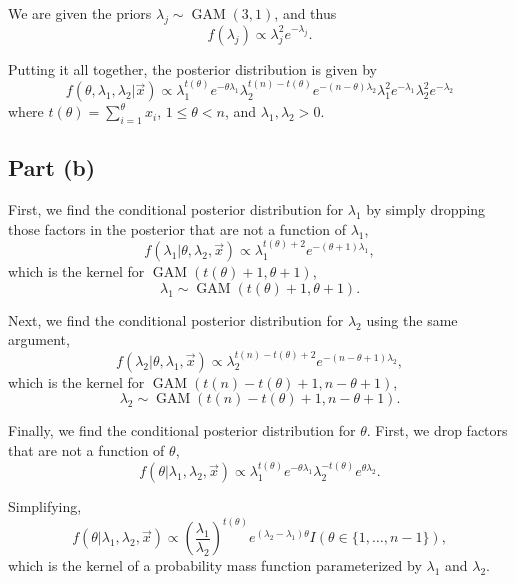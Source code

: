 \documentclass[
  11pt,
]{article}
\begin{document}
We are given the priors \(\lambda_j \sim \operatorname{GAM}(3,1)\), and
thus \[
  f(\lambda_j) \propto \lambda_j^2 e^{-\lambda_j}.
\]

Putting it all together, the posterior distribution is given by \[
  f(\theta,\lambda_1,\lambda_2|\vec{x}) \propto
    \lambda_1^{t(\theta)} e^{-\theta \lambda_1}
    \lambda_2^{t(n)-t(\theta)} e^{-(n-\theta) \lambda_2} \lambda_1^2 e^{-\lambda_1} \lambda_2^2 e^{-\lambda_2}
\] where \(t(\theta) = \sum_{i=1}^{\theta} x_i\), \(1 \leq \theta < n\),
and \(\lambda_1,\lambda_2 > 0\).

\hypertarget{part-b-1}{%
\subsection{Part (b)}\label{part-b-1}}


First, we find the conditional posterior distribution for \(\lambda_1\)
by simply dropping those factors in the posterior that are not a
function of \(\lambda_1\), \[
  f(\lambda_1|\theta,\lambda_2,\vec{x}) \propto \lambda_1^{t(\theta) + 2} e^{-(\theta+1) \lambda_1},
\] which is the kernel for \(\operatorname{GAM}(t(\theta)+1,\theta+1)\),
\[
  \lambda_1 \sim \operatorname{GAM}(t(\theta)+1,\theta+1).
\]

Next, we find the conditional posterior distribution for \(\lambda_2\)
using the same argument, \[
  f(\lambda_2|\theta,\lambda_1,\vec{x}) \propto
    \lambda_2^{t(n)-t(\theta)+2} e^{-(n-\theta+1) \lambda_2},
\] which is the kernel for
\(\operatorname{GAM}(t(n)-t(\theta)+1,n-\theta+1)\), \[
  \lambda_2 \sim \operatorname{GAM}(t(n) - t(\theta) + 1,n-\theta+1).
\]

Finally, we find the conditional posterior distribution for \(\theta\).
First, we drop factors that are not a function of \(\theta\), \[
  f(\theta|\lambda_1,\lambda_2,\vec{x}) \propto
    \lambda_1^{t(\theta)} e^{-\theta \lambda_1}
    \lambda_2^{-t(\theta)} e^{\theta \lambda_2}.
\]

Simplifying, \[
  f(\theta|\lambda_1,\lambda_2,\vec{x}) \propto
    \left(\frac{\lambda_1}{\lambda_2}\right)^{t(\theta)} e^{(\lambda_2 - \lambda_1) \theta} I(\theta \in \{1,\ldots,n-1\}),
\] which is the kernel of a probability mass function parameterized by
\(\lambda_1\) and \(\lambda_2\).
\end{document}
